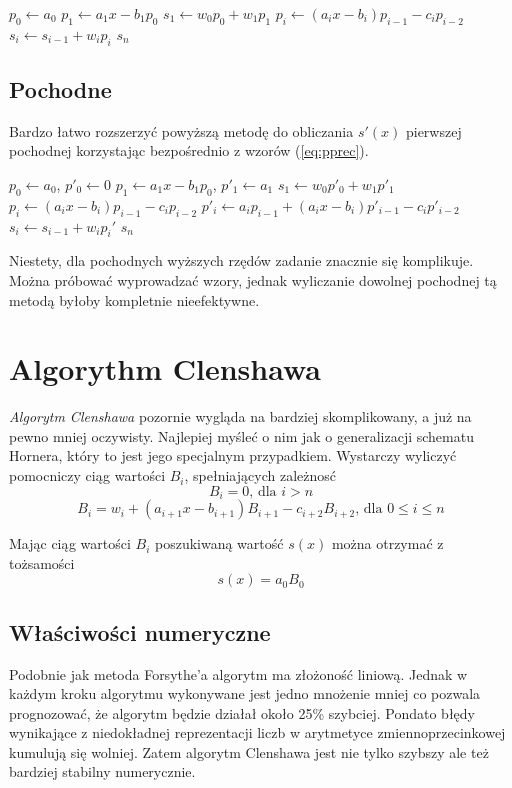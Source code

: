 \documentclass[11pt,leqno]{article}
\begin{document}
\begin{algorithmic}
\State $p_0 \gets a_0$
\State $p_1 \gets a_1 x - b_1 p_0$
\State $s_1 \gets w_0 p_0 + w_1 p_1$
  \State $p_i \gets (a_i x - b_i) p_{i - 1} - c_i p_{i - 2}$
  \State $s_i \gets s_{i - 1} + w_i p_i$
\EndFor
\State \Return $s_n$
\end{algorithmic}


\subsection{Pochodne}
Bardzo łatwo rozszerzyć powyższą metodę do obliczania $s'(x)$ pierwszej pochodnej korzystając bezpośrednio z wzorów (\ref{eq:pprec}).

\begin{algorithmic}
\State $p_0 \gets a_0$, $p'_0 \gets 0$
\State $p_1 \gets a_1 x - b_1 p_0$, $p'_1 \gets a_1$
\State $s_1 \gets w_0 p'_0 + w_1 p'_1$
  \State $p_i \gets (a_i x - b_i) p_{i - 1} - c_i p_{i - 2}$
  \State $p'_i \gets a_i p_{i - 1} + (a_i x - b_i) p'_{i - 1} - c_i p'_{i - 2}$
  \State $s_i \gets s_{i - 1} + w_i p_i'$
\EndFor
\State \Return $s_n$
\end{algorithmic}

Niestety, dla pochodnych wyższych rzędów zadanie znacznie się komplikuje. Można próbować wyprowadzać wzory, jednak wyliczanie dowolnej pochodnej tą metodą byłoby kompletnie nieefektywne.


\section{Algorythm Clenshawa}
\textit{Algorytm Clenshawa} pozornie wygląda na bardziej skomplikowany, a już na pewno mniej oczywisty. Najlepiej myśleć o nim jak o generalizacji schematu Hornera, który to jest jego specjalnym przypadkiem. Wystarczy wyliczyć pomocniczy ciąg wartości $B_i$, spełniających zależnosć
\[
  B_i = 0 \text{, dla } i > n
\]
\[
  B_i = w_i + (a_{i + 1} x - b_{i + 1}) B_{i + 1} - c_{i + 2} B_{i + 2}
  \text{, dla } 0 \leq i \leq n
\]

Mając ciąg wartości $B_i$ poszukiwaną wartość $s(x)$ można otrzymać z tożsamości
\[
  s(x) = a_0 B_0
\]

\subsection{Właściwości numeryczne}
Podobnie jak metoda Forsythe'a algorytm ma złożoność liniową. Jednak w każdym kroku algorytmu wykonywane jest jedno mnożenie mniej co pozwala prognozować, że algorytm będzie działał około 25\% szybciej. Pondato błędy wynikające z niedokładnej reprezentacji liczb w arytmetyce zmiennoprzecinkowej kumulują się wolniej. Zatem algorytm Clenshawa jest nie tylko szybszy ale też bardziej stabilny numerycznie.
\end{document}
